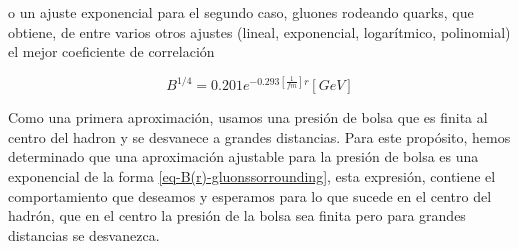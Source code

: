 o un ajuste exponencial para el \allowbreak segundo caso, gluones rodeando quarks, que obtiene, de entre \allowbreak varios otros ajustes (lineal, exponencial, \allowbreak logarítmico, polinomial) el mejor \allowbreak coeficiente de correlación

\begin{equation}\label{eq-B(r)-gluonssorrounding}
{B}^{1/4} = 0.201  {e}^{-0.293\left[\frac{1}{fm}\right]r} \left[{GeV}\right]
\end{equation}

Como una primera aproximación, usamos una presión de bolsa que es finita al centro del hadron y se desvanece a grandes distancias. Para este propósito, hemos determinado que una aproximación ajustable para la presión de bolsa es una exponencial de la forma \eqref{eq-B(r)-gluonssorrounding}, esta expresión, contiene el comportamiento que deseamos y esperamos para lo que sucede en el centro del hadrón, que en el centro la presión de la bolsa sea finita pero para grandes distancias se desvanezca.